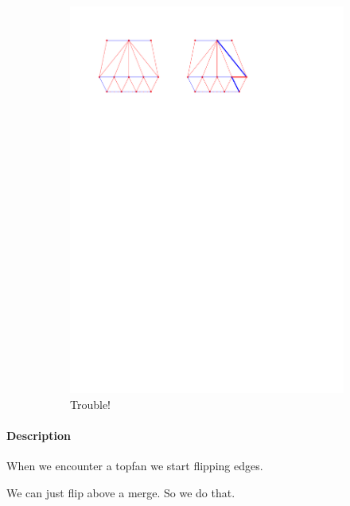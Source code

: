 \begin{figure}
\begin{subfigure}[b]{0.45 \textwidth}
    \end{subfigure}
    ~
    \begin{subfigure}[b]{0.45 \textwidth}
        \includegraphics[width =\textwidth]{topFanFlips/img/splitfront}
        \caption{Trouble!}
        \label{fig:fanflip:splitFirstVertex}

    \end{subfigure}

    \caption{}
    \label{fig:fanflip:fanflips}
\end{figure}


\paragraph{Description}
When we encounter a topfan we start flipping edges.

We can just flip above a merge. So we do that.

